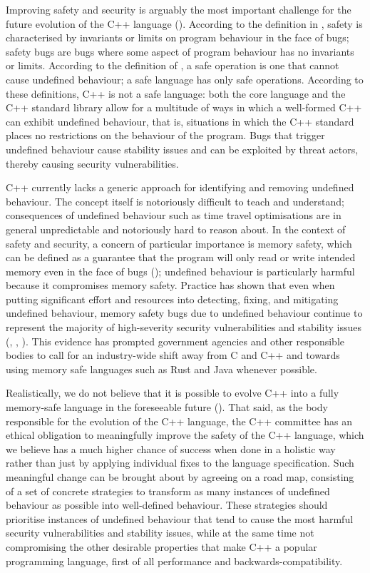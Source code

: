 Improving safety and security is arguably the most important challenge for the future evolution of the C++ language (\cite{Bastien2023}). According to the definition in \cite{Carruth2023}, safety is characterised by invariants or limits on program behaviour in the face of bugs; safety bugs are bugs where some aspect of program behaviour has no invariants or limits. According to the definition of \cite{Abrahams2023}, a safe operation is one that cannot cause undefined behaviour; a safe language has only safe operations. According to these definitions, C++ is not a safe language: both the core language and the C++ standard library allow for a multitude of ways in which a well-formed C++ can exhibit undefined behaviour, that is, situations in which the C++ standard places no restrictions on the behaviour of the program. Bugs that trigger undefined behaviour cause stability issues and can be exploited by threat actors, thereby causing security vulnerabilities.

C++ currently lacks a generic approach for identifying and removing undefined behaviour. The concept itself is notoriously difficult to teach and understand; consequences of undefined behaviour such as time travel optimisations are in general unpredictable and notoriously hard to reason about. In the context of safety and security, a concern of particular importance is memory safety, which can be defined as a guarantee that the program will only read or write intended memory even in the face of bugs (\cite{Carruth2023}); undefined behaviour is particularly harmful because it compromises memory safety. Practice has shown that even when putting significant effort and resources into detecting, fixing, and mitigating undefined behaviour, memory safety bugs due to undefined behaviour continue to represent the majority of high-severity security vulnerabilities and stability issues (\cite{NSA2022}, \cite{CR2023}, \cite{CISA2023}). This evidence has prompted government agencies and other responsible bodies to call for an industry-wide shift away from C and C++ and towards using memory safe languages such as Rust and Java whenever possible.

Realistically, we do not believe that it is possible to evolve C++ into a fully memory-safe language in the foreseeable future (\cite{Doumler2023}). That said, as the body responsible for the evolution of the C++ language, the C++ committee has an ethical obligation to meaningfully improve the safety of the C++ language, which we believe has a much higher chance of success when done in a holistic way rather than just by applying individual fixes to the language specification. Such meaningful change can be brought about by agreeing on a road map, consisting of a set of concrete strategies to transform as many instances of undefined behaviour as possible into well-defined behaviour. These strategies should prioritise instances of undefined behaviour that tend to cause the most harmful security vulnerabilities and stability issues, while at the same time not compromising the other desirable properties that make C++ a popular programming language, first of all performance and backwards-compatibility.

